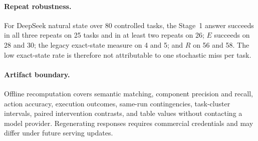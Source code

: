 \documentclass[11pt]{article}
\newcommand{\Rsupport}{R}
\newcommand{\Eoutcome}{E}
\begin{document}
\paragraph{Repeat robustness.}
For DeepSeek natural state over 80 controlled tasks, the Stage~1 answer succeeds in all three repeats on 25 tasks and in at least two repeats on 26; \(\Eoutcome\) succeeds on 28 and 30; the legacy exact-state measure on 4 and 5; and \(\Rsupport\) on 56 and 58. The low exact-state rate is therefore not attributable to one stochastic miss per task.

\paragraph{Artifact boundary.}
Offline recomputation covers semantic matching, component precision and recall, action accuracy, execution outcomes, same-run contingencies, task-cluster intervals, paired intervention contrasts, and table values without contacting a model provider. Regenerating responses requires commercial credentials and may differ under future serving updates.
\end{document}
